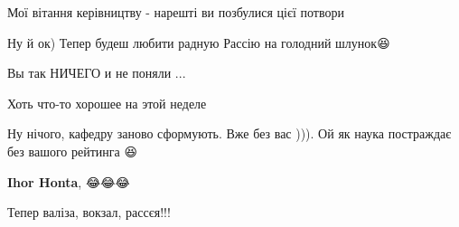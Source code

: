 \begin{itemize}
Мої вітання керівництву - нарешті ви позбулися цієї потвори

 
Ну й ок) Тепер будеш любити радную Рассію на голодний шлунок😆

 
Вы так НИЧЕГО и не поняли ...

 

Хоть что-то хорошее на этой неделе \Smiley[1.0][yellow]

 
Ну нічого, кафедру заново сформують. Вже без вас ))). Ой як наука постраждає без вашого рейтинга 😆

\begin{itemize}
 
\textbf{Ihor Honta}, 😂😂😂
\end{itemize}

 
Тепер валіза, вокзал, рассєя!!!

 


\end{itemize}
